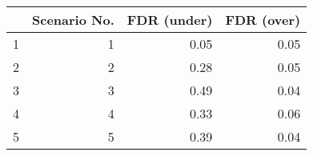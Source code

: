 \begin{tabular}{rrrr}
  \hline
 & Scenario No. & FDR (under) & FDR (over) \\ 
  \hline
1 &   1 & 0.05 & 0.05 \\ 
  2 &   2 & 0.28 & 0.05 \\ 
  3 &   3 & 0.49 & 0.04 \\ 
  4 &   4 & 0.33 & 0.06 \\ 
  5 &   5 & 0.39 & 0.04 \\ 
   \hline
\end{tabular}
